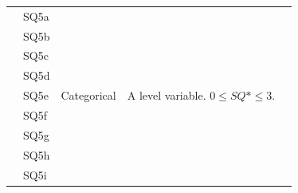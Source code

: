 \documentclass[]{book}
\begin{document}
\begin{table}[ht]
\begin{tabular}{|l|l|l|p{3cm}|p{5cm}|}
        & SQ5a                                  & \multirow{14}{*}{Categorical}      & \multirow{14}{3cm}{A level variable. $ 0 \leq SQ* \leq 3 $.} &                                                                                                                 \\ \cline{2-2}
        & SQ5b                                  &                                    &                                                         &                                                                                                                 \\ \cline{2-2}
        & SQ5c                                  &                                    &                                                         &                                                                                                                 \\ \cline{2-2}
        & SQ5d                                  &                                    &                                                         &                                                                                                                 \\ \cline{2-2}
        & SQ5e                                  &                                    &                                                         &                                                                                                                 \\ \cline{2-2}
        & SQ5f                                  &                                    &                                                         &                                                                                                                 \\ \cline{2-2}
        & SQ5g                                  &                                    &                                                         &                                                                                                                 \\ \cline{2-2}
        & SQ5h                                  &                                    &                                                         &                                                                                                                 \\ \cline{2-2}
        & SQ5i                                  &                                    &                                                         &                                                                                                                 \\ \cline{2-2}

\end{tabular}
\end{table}
\end{document}

